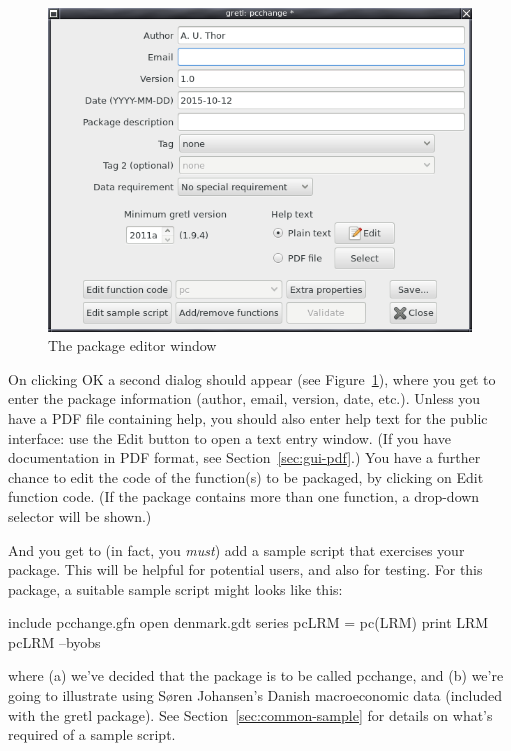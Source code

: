 \documentclass[oneside]{book}
\begin{document}
\begin{figure}[htbp]
  \centering
  \includegraphics[scale=0.55]{figures/package_editor}
  \caption{The package editor window}
  \label{fig:package_editor}
\end{figure}

On clicking \textsf{OK} a second dialog should appear (see
Figure~\ref{fig:package_editor}), where you get to enter the package
information (author, email, version, date, etc.). Unless you have a
PDF file containing help, you should also enter help text for the
public interface: use the \textsf{Edit} button to open a text entry
window. (If you have documentation in PDF format, see
Section~\ref{sec:gui-pdf}.) You have a further chance to edit the code
of the function(s) to be packaged, by clicking on \textsf{Edit
  function code}.  (If the package contains more than one function, a
drop-down selector will be shown.)

And you get to (in fact, you \textit{must}) add a sample script that
exercises your package.  This will be helpful for potential users, and
also for testing. For this package, a suitable sample script might
looks like this:
%
\begin{code}
include pcchange.gfn
open denmark.gdt
series pcLRM = pc(LRM)
print LRM pcLRM --byobs
\end{code}
%
where (a) we've decided that the package is to be called
\textsf{pcchange}, and (b) we're going to illustrate using S\o{}ren
Johansen's Danish macroeconomic data (included with the gretl
package). See Section~\ref{sec:common-sample} for details on what's
required of a sample script.
\end{document}
